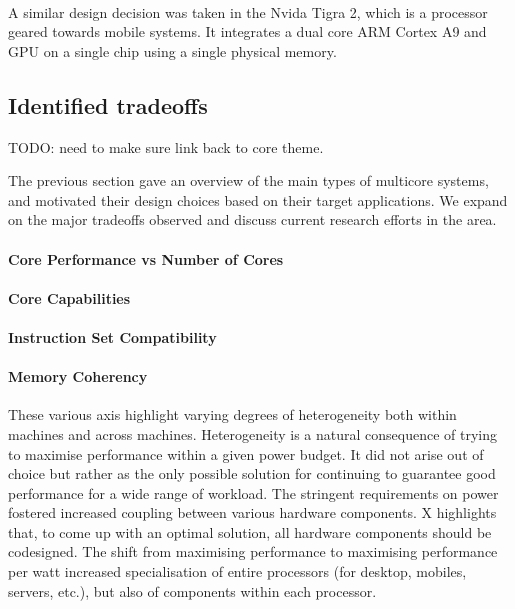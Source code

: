 \paragraph{}A similar design decision was taken in the Nvida Tigra 2, which is 
a processor geared towards mobile systems. It integrates a dual
core ARM Cortex A9 and GPU on a single chip using a single physical memory. 



\subsection{Identified tradeoffs}
TODO: need to make sure link back to core theme. 

The previous section gave an overview of the main types of multicore systems, 
and motivated their design choices based on their target applications. 
We expand on the major tradeoffs observed and discuss current research efforts in the area. 
\paragraph{Core Performance vs Number of Cores}
\paragraph{Core Capabilities}
\paragraph{Instruction Set Compatibility }
\paragraph{Memory Coherency}

These various axis highlight varying degrees of heterogeneity both within
machines and across machines. Heterogeneity is a natural consequence of 
trying to maximise performance within a given power budget. It did not arise
out of choice but rather as the only possible solution for continuing to guarantee
good performance for a wide range of workload. The stringent requirements
on power fostered increased coupling between various hardware components.
X  highlights that, to come up with an optimal solution, all hardware components
should be codesigned. The shift from maximising performance to maximising performance
per watt increased specialisation of entire processors (for desktop, mobiles,
servers, etc.), but also of components within each processor. 

